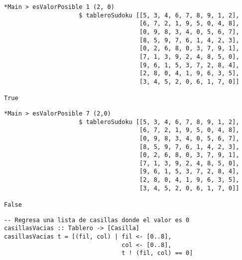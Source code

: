 \documentclass{beamer}
\begin{document}
\begin{frame}[fragile]
\begin{verbatim}
*Main > esValorPosible 1 (2, 0)
                     $ tableroSudoku [[5, 3, 4, 6, 7, 8, 9, 1, 2], 
                                      [6, 7, 2, 1, 9, 5, 0, 4, 8], 
                                      [0, 9, 8, 3, 4, 0, 5, 6, 7], 
                                      [8, 5, 9, 7, 6, 1, 4, 2, 3], 
                                      [0, 2, 6, 8, 0, 3, 7, 9, 1], 
                                      [7, 1, 3, 9, 2, 4, 8, 5, 0], 
                                      [9, 6, 1, 5, 3, 7, 2, 8, 4], 
                                      [2, 8, 0, 4, 1, 9, 6, 3, 5], 
                                      [3, 4, 5, 2, 0, 6, 1, 7, 0]]

True
\end{verbatim}
\end{frame}


\begin{frame}[fragile]
\begin{verbatim}
*Main > esValorPosible 7 (2,0)
                     $ tableroSudoku [[5, 3, 4, 6, 7, 8, 9, 1, 2], 
                                      [6, 7, 2, 1, 9, 5, 0, 4, 8], 
                                      [0, 9, 8, 3, 4, 0, 5, 6, 7], 
                                      [8, 5, 9, 7, 6, 1, 4, 2, 3], 
                                      [0, 2, 6, 8, 0, 3, 7, 9, 1], 
                                      [7, 1, 3, 9, 2, 4, 8, 5, 0], 
                                      [9, 6, 1, 5, 3, 7, 2, 8, 4], 
                                      [2, 8, 0, 4, 1, 9, 6, 3, 5], 
                                      [3, 4, 5, 2, 0, 6, 1, 7, 0]]

False
\end{verbatim}
\end{frame}


\begin{frame}[fragile]
\begin{verbatim}
-- Regresa una lista de casillas donde el valor es 0
casillasVacias :: Tablero -> [Casilla]
casillasVacias t = [(fil, col) | fil <- [0..8], 
                                 col <- [0..8], 
                                 t ! (fil, col) == 0]
\end{verbatim}
\end{frame}

\end{document}
